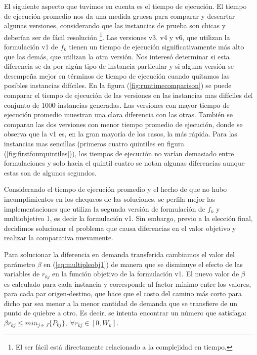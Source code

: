 \documentclass{article}
\begin{document}
  El siguiente aspecto que tuvimos en cuenta es el tiempo de ejecución. El tiempo de ejecución promedio nos da una medida gruesa para comparar y descartar algunas versiones, considerando que las instancias de prueba son chicas y deberían ser de fácil resolución \footnote{El ser fácil está directamente relacionado a la complejidad en tiempo.}. Las versiones v3, v4 y v6, que utilizan la formulación v1 de $f_k$ tienen un tiempo de ejecución significativamente más alto que las demás, que utilizan la otra versión. Nos interesó determinar si esta diferencia se da por algún tipo de instancia particular y si alguna versión se desempeña mejor en términos de tiempo de ejecución cuando quitamos las posibles instancias difíciles. En la figura (\ref{fig:runtimecomparison}) se puede comparar el tiempo de ejecución de las versiones en las instancias mas difíciles del conjunto de 1000 instancias generadas. Las versiones con mayor tiempo de ejecución promedio muestran una clara diferencia con las otras. También se comparan las dos versiones con menor tiempo promedio de ejecución, donde se observa que la v1 es, en la gran mayoría de los casos, la más rápida. Para las instancias mas sencillas (primeros cuatro quintiles en figura (\ref{fig:firstfourquintiles})), los tiempos de ejecución no varían demasiado entre formulaciones y solo hacia el quintil cuatro se notan algunas diferencias aunque estas son de algunos segundos.

  Considerando el tiempo de ejecución promedio y el hecho de que no hubo incumplimientos en los chequeos de las soluciones, se perfila mejor las implementaciones que utiliza la segunda versión de formulación de $f_k$ y multiobjetivo 1, es decir la formulación v1. Sin embargo, previo a la elección final, decidimos solucionar el problema que causa diferencias en el valor objetivo y realizar la comparativa nuevamente.

  Para solucionar la diferencia en demanda transferida cambiamos el valor del parámetro $\beta$ en (\ref{eq:multipleobj1}) de manera que se disminuye el efecto de las variables de $r_{kj}$ en la función objetivo de la formulación v1. El nuevo valor de $\beta$ es calculado para cada instancia y corresponde al factor mínimo entre los valores, para cada par origen-destino, que hace que el costo del camino más corto para dicho par sea menor a la menor cantidad de demanda que se transfiere de un punto de quiebre a otro. Es decir, se intenta encontrar un número que satisfaga: $\beta r_{kj} \leq min_{j \in J} \{ P_{kj} \},\; \forall r_{kj} \in [0, W_k]$.
\end{document}
